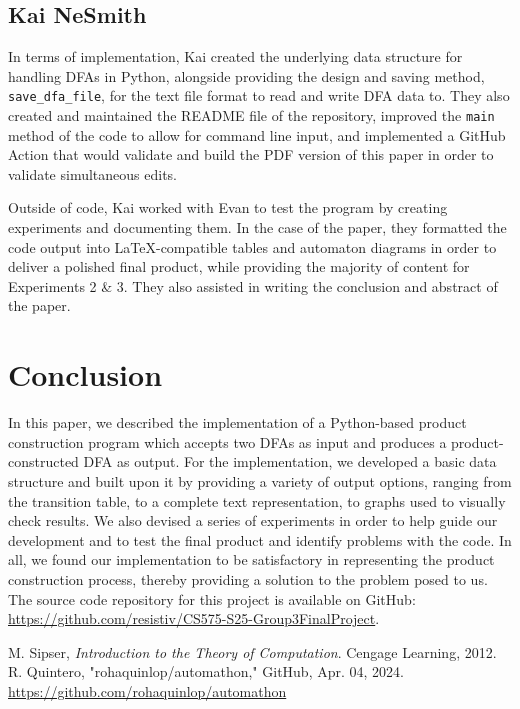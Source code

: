 \documentclass[conference]{IEEEtran}
\begin{document}
\subsection{Kai NeSmith}
In terms of implementation, Kai created the underlying data structure for handling DFAs in Python, alongside providing the design and saving method, \texttt{save\_dfa\_file}, for the text file format to read and write DFA data to. They also created and maintained the README file of the repository, improved the \texttt{main} method of the code to allow for command line input, and implemented a GitHub Action that would validate and build the PDF version of this paper in order to validate simultaneous edits.

Outside of code, Kai worked with Evan to test the program by creating experiments and documenting them. In the case of the paper, they formatted the code output into \LaTeX-compatible tables and automaton diagrams in order to deliver a polished final product, while providing the majority of content for Experiments 2 \& 3. They also assisted in writing the conclusion and abstract of the paper.

\section{Conclusion}
In this paper, we described the implementation of a Python-based product construction program which accepts two DFAs as input and produces a product-constructed DFA as output. For the implementation, we developed a basic data structure and built upon it by providing a variety of output options, ranging from the transition table, to a complete text representation, to graphs used to visually check results. We also devised a series of experiments in order to help guide our development and to test the final product and identify problems with the code. In all, we found our implementation to be satisfactory in representing the product construction process, thereby providing a solution to the problem posed to us. The source code repository for this project is available on GitHub: \url{https://github.com/resistiv/CS575-S25-Group3FinalProject}.

\begin{thebibliography}{00}
 M. Sipser, \textit{Introduction to the Theory of Computation}. Cengage Learning, 2012.
 R. Quintero, "rohaquinlop/automathon," GitHub, Apr. 04, 2024. \url{https://github.com/rohaquinlop/automathon}
\end{thebibliography}
\end{document}
